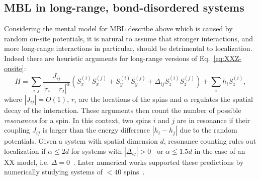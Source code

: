 
%


\subsection{MBL in long-range, bond-disordered systems}
Considering the mental model for MBL describe above which is caused by random on-site potentials, it is natural to assume that stronger interactions, and more long-range interactions in particular, should be detrimental to localization. Indeed there are heuristic arguments for long-range versions of Eq.~\ref{eq:XXZ-onsite}:
\begin{equation}\label{eq:long-range-on-site-XXZ}
	H = \sum_{i,j} \frac{J_{ij}}{|r_i-r_j|^\alpha} \left(S_x^{(i)}S_x^{(j)} + S_y^{(i)}S_y^{(j)} + \Delta_{ij} S_z^{(i)}S_z^{(j)}\right) + \sum_i h_i S_z^{(i)},
\end{equation}
where $|J_{ij}|=O(1)$, $r_i$ are the locations of the spins and $\alpha$ regulates the spatial decay of the interaction. These arguments then count the number of possible \emph{resonances} for a spin. In this context, two spins $i$ and $j$ are in resonance if their coupling $J_{ij}$ is larger than the energy difference $|h_i-h_j|$ due to the random potentials.
Given a system with spatial dimension $d$, resonance counting rules out localization if $\alpha \leq 2d$ for systems with $|\Delta_{ij}| >0$~\cite{burinEnergyDelocalizationStrongly2006,yaoManyBodyLocalizationDipolar2014,burinManybodyDelocalizationStrongly2015,gutmanEnergyTransportAnderson2016} or $\alpha \leq 1.5d$ in the case of an XX model, i.e. $\Delta=0$~\cite{burinLocalizationRandomXY2015}. Later numerical works supported these predictions by numerically studying systems of $< 40$ spins~\cite{schifferManybodyLocalizationSpin2019,safavi-nainiQuantumDynamicsDisordered2019,yousefjaniMobilityEdgeLongrange2023}.

